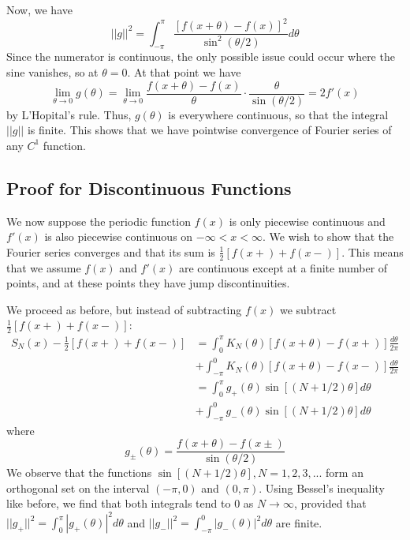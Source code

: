 \documentclass[12pt, a4paper, oneside, openright, titlepage]{book}
\begin{document}
Now, we have \begin{equation*}
    ||g||^2 = \int_{-\pi}^{\pi}\frac{[f(x+\theta)-f(x)]^2}{\sin^2(\theta/2)}d\theta
\end{equation*}
Since the numerator is continuous, the only possible issue could occur where the sine vanishes, so at $\theta = 0$. At that point we have \begin{equation*}
    \lim\limits_{\theta\rightarrow 0}g(\theta) = \lim\limits_{\theta\rightarrow 0}\frac{f(x+\theta)-f(x)}{\theta}\cdot\frac{\theta}{\sin(\theta/2)} = 2f'(x)
\end{equation*}
by L'Hopital's rule. Thus, $g(\theta)$ is everywhere continuous, so that the integral $||g||$ is finite. This shows that we have pointwise convergence of Fourier series of any $C^1$ function.

\subsection{Proof for Discontinuous Functions}

We now suppose the periodic function $f(x)$ is only piecewise continuous and $f'(x)$ is also piecewise continuous on $-\infty < x < \infty$. We wish to show that the Fourier series converges and that its sum is $\frac{1}{2}[f(x+)+f(x-)]$. This means that we assume $f(x)$ and $f'(x)$ are continuous except at a finite number of points, and at these points they have jump discontinuities. 

We proceed as before, but instead of subtracting $f(x)$ we subtract $\frac{1}{2}[f(x+)+f(x-)]$: \begin{align*}
    S_N(x) - \frac{1}{2}[f(x+)+f(x-)] &= \int_0^{\pi}K_N(\theta)[f(x+\theta)-f(x+)]\frac{d\theta}{2\pi} \\
    &+ \int_{-\pi}^0K_N(\theta)[f(x+\theta)-f(x-)]\frac{d\theta}{2\pi} \\
    &= \int_0^{\pi}g_+(\theta)\sin[(N+1/2)\theta]d\theta \\
    &+\int_{-\pi}^0g_-(\theta)\sin[(N+1/2)\theta]d\theta
\end{align*}
where \begin{equation*}
    g_{\pm}(\theta) = \frac{f(x+\theta)-f(x\pm)}{\sin(\theta/2)}
\end{equation*}
We observe that the functions $\sin[(N+1/2)\theta], N = 1,2,3,...$ form an orthogonal set on the interval $(-\pi,0)$ and $(0,\pi)$. Using Bessel's inequality like before, we find that both integrals tend to $0$ as $N\rightarrow \infty$, provided that $||g_+||^2 = \int_0^{\pi}|g_+(\theta)|^2d\theta$ and $||g_-||^2 = \int_{-\pi}^0|g_-(\theta)|^2d\theta$ are finite. 
\end{document}
